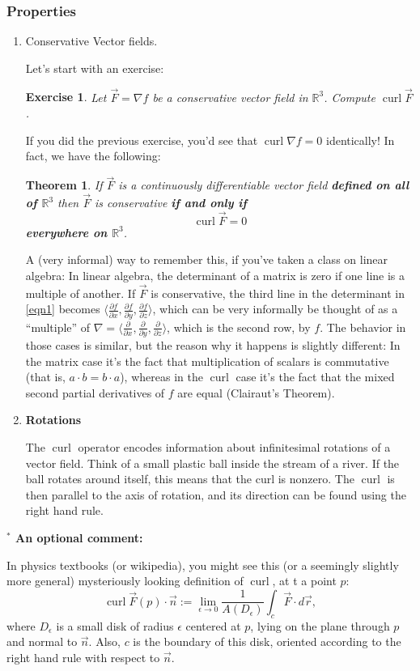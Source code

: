 \documentclass[12pt]{article}
\newcommand{\p}{\partial}
\newcommand{\R}{ \mathbb{R}}
\newcommand{\e}{\epsilon}
\newcommand{\vr}{\vec{r}{}}
\newcommand{\vF}{\vec{F}}
\renewcommand{\lg}{\langle}
\newcommand{\rg}{\rangle}
\DeclareMathOperator{\curl}{curl}
\newcommand{\n}{\nabla}
\newcommand{\px}{\frac{\p }{\p x}}
\newcommand{\py}{\frac{\p }{\p y}}
\newcommand{\pz}{\frac{\p }{\p z}}
\newtheorem{exr}{Exercise}
\newtheorem{thm}{Theorem}
\begin{document}
\subsubsection*{Properties}
\begin{enumerate}
\item Conservative Vector fields.

Let's start with an exercise:
\begin{exr}
Let $\vF=\n f$ be a conservative vector field in $\R^3$. Compute $\curl \vF$.
\end{exr}


If you did the previous exercise, you'd see that $\curl \n f=0$ identically! In fact, we have the following:
\begin{thm} If $\vF$ is a continuously differentiable vector field \textbf{defined on all of $\R^3$} then $\vF$ is conservative \textbf{if and only if} $$\curl\vF=0$$ \textbf{everywhere on $\R^3$}.
\end{thm}

A (very informal) way to remember this, if you've taken a class on linear algebra: In linear algebra, the determinant of a matrix is zero if one line is a multiple of another. If $\vF$ is conservative, the third line in the determinant in \eqref{eqn1} becomes $\lg \frac{\p f}{\p x},\frac{\p f}{\p y},\frac{\p f}{\p z}\rg$, which can be very informally be thought of as a ``multiple'' of $\n=\lg \px,\py,\pz\rg$, which is the second row, by $f$. The behavior in those cases is similar, but the reason why it happens is slightly different: In the matrix case it's the fact that multiplication of scalars is commutative (that is, $a\cdot b=b\cdot a$), whereas in the $\curl$ case it's the fact that the mixed second partial derivatives of $f$ are equal (Clairaut's Theorem).



\item \textbf{Rotations}

The $\curl$ operator encodes information about infinitesimal rotations of a vector field. Think of a small plastic ball inside the stream of a river. If the ball rotates around itself, this means that the curl is nonzero. The $\curl$ is then parallel to the axis of rotation, and its direction can be found using the right hand rule.

\end{enumerate}
\textbf{${}^*$ An optional comment:}

In physics textbooks (or wikipedia), you might see this (or a seemingly slightly more general) mysteriously looking definition of $\curl$, at t a point $p$:
\begin{equation}
\curl\vF(p)\cdot\vec{n}:=\lim_{\e\to 0}\frac{1}{A(D_\e)}\int_c \vF\cdot d\vr,
\end{equation}
where $D_\e$ is a small disk of radius $\e$ centered at $p$, lying on the plane through $p$ and normal to $\vec{n}$. Also, $c$ is the boundary of this disk, oriented according to the right hand rule with respect to $\vec{n}$. 
\end{document}
